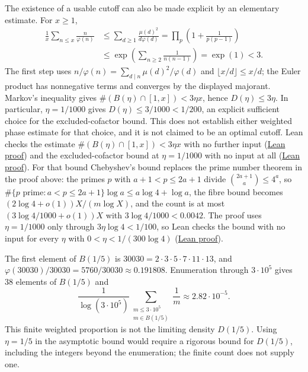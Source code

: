 \noindent
The existence of a usable cutoff can also be made explicit by an
elementary estimate. For $x\ge1$,
\[
\begin{aligned}
 \frac1x\sum_{n\le x}\frac n{\varphi(n)}
 &\le\sum_{d\ge1}\frac{\mu(d)^2}{d\varphi(d)}
   =\prod_p\left(1+\frac1{p(p-1)}\right)\\
 &\le\exp\left(\sum_{n\ge2}\frac1{n(n-1)}\right)
   =\exp(1)<3.
\end{aligned}
\]
The first step uses
$n/\varphi(n)=\sum_{d\mid n}\mu(d)^2/\varphi(d)$ and
$\lfloor x/d\rfloor\le x/d$; the Euler product has nonnegative terms
and converges by the displayed majorant. Markov's inequality gives
$\#(B(\eta)\cap[1,x])<3\eta x$, hence $D(\eta)\le3\eta$.
In particular, $\eta=1/1000$ gives
$D(\eta)\le3/1000<1/200$, an explicit sufficient choice for the
excluded-cofactor bound. This does not establish either weighted phase
estimate for that choice, and it is not claimed to be an optimal cutoff.
Lean checks the estimate $\#(B(\eta)\cap[1,x])<3\eta x$ with no further input
(\href{https://github.com/wcook04/plectis-erdos/blob/76f44c5329c0e207f5376062c7d79125485fbceb/lean/ErdosProblems/Erdos249/PaperCompleteR21/ExcludedCofactorDensity.lean\#L361}{Lean proof})
and the excluded-cofactor bound at $\eta=1/1000$ with no input at all
(\href{https://github.com/wcook04/plectis-erdos/blob/57941a741fceaae33ab7e2513a9cd11fee060081/lean/ErdosProblems/Erdos249/PaperCompleteR21/ExcludedCofactorEstimate.lean\#L910}{Lean proof}).
For that bound Chebyshev's bound replaces the prime number theorem in the
proof above: the primes $p$ with $a+1<p\le2a+1$ divide
$\binom{2a+1}{a}\le4^a$, so
$\#\{p\text{ prime}:a<p\le2a+1\}\log a\le a\log4+\log a$, the fibre bound
becomes $(2\log4+o(1))X/(m\log X)$, and the count is at most
$(3\log4/1000+o(1))X$ with $3\log4/1000<0.0042$.
The proof uses $\eta=1/1000$ only through $3\eta\log4<1/100$, so Lean checks
the bound with no input for every $\eta$ with $0<\eta<1/(300\log4)$
(\href{https://github.com/wcook04/plectis-erdos/blob/ab690b0aa515faa3a432e9d47de288704ebf6bb5/lean/ErdosProblems/Erdos249/PaperCompleteR21/ExcludedCofactorEstimate.lean\#L930}{Lean proof}).

The first element of $B(1/5)$ is
$30030=2\cdot3\cdot5\cdot7\cdot11\cdot13$, and
$\varphi(30030)/30030=5760/30030\approx0.191808$. Enumeration through
$3\cdot10^5$ gives $38$ elements of $B(1/5)$ and
\[
 \frac{1}{\log(3\cdot10^5)}
 \sum_{\substack{m\le3\cdot10^5\\m\in B(1/5)}}\frac1m
 \approx2.82\cdot10^{-5}.
\]
This finite weighted proportion is not the limiting density $D(1/5)$.
Using $\eta=1/5$ in the asymptotic bound would require a
rigorous bound for $D(1/5)$, including the integers beyond the enumeration;
the finite count does not supply one.

